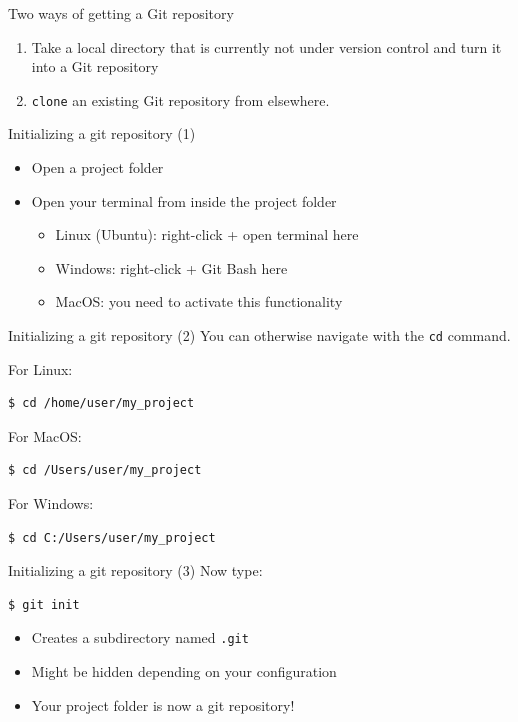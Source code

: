 \documentclass[handout]{beamer}
\begin{document}

\begin{frame}{Two ways of getting a Git repository}
	\begin{enumerate}
		\item Take a local directory that is currently not under version control and turn it into a Git repository
		\item \texttt{clone} an existing Git repository from elsewhere.
	\end{enumerate}
\end{frame}

\begin{frame}{Initializing a git repository (1)}
	\begin{itemize}
		\item Open a project folder
		\item Open your terminal from inside the project folder
		\begin{itemize}
			\item Linux (Ubuntu): right-click + open terminal here
			\item Windows: right-click + Git Bash here
			\item MacOS: you need to activate this functionality
    \end{itemize}
  \end{itemize}
\end{frame}

\begin{frame}[fragile]{Initializing a git repository (2)}
You can otherwise navigate with the \texttt{cd} command.

\vspace{0.5cm}

For Linux:
\begin{lstlisting}
$ cd /home/user/my_project
\end{lstlisting}

For MacOS:
\begin{lstlisting}
$ cd /Users/user/my_project
\end{lstlisting}

For Windows:
\begin{lstlisting}
$ cd C:/Users/user/my_project
\end{lstlisting}

\end{frame}

\begin{frame}[fragile]{Initializing a git repository (3)}
	Now type:
\begin{lstlisting}
$ git init
\end{lstlisting}
	\begin{itemize}
		\item Creates a subdirectory named \texttt{.git}
		\item Might be hidden depending on your configuration
		\item Your project folder is now a git repository!
	\end{itemize}
\end{frame}
\end{document}
